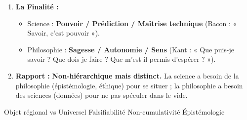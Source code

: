 \documentclass[11pt]{article}
\newcommand{\cle}[1]{{\popxbold\color{popdark}#1}}
\begin{document}
\begin{methode}
\begin{enumerate}
\begin{itemize}
    \end{itemize}
    \item \textbf{La Finalité :}
    \begin{itemize}
        \item Science : \textbf{Pouvoir / Prédiction / Maîtrise technique} (Bacon : « Savoir, c'est pouvoir »).
        \item Philosophie : \textbf{Sagesse / Autonomie / Sens} (Kant : « Que puis-je savoir ? Que dois-je faire ? Que m'est-il permis d'espérer ? »).
    \end{itemize}
    \item \textbf{Rapport :} \textbf{Non-hiérarchique mais distinct.} La science a besoin de la philosophie (épistémologie, éthique) pour se situer ; la philosophie a besoin des sciences (données) pour ne pas spéculer dans le vide.
\end{enumerate}
\cle{Objet régional vs Universel} \cle{Falsifiabilité} \cle{Non-cumulativité} \cle{Épistémologie}
\end{methode}
\end{document}
